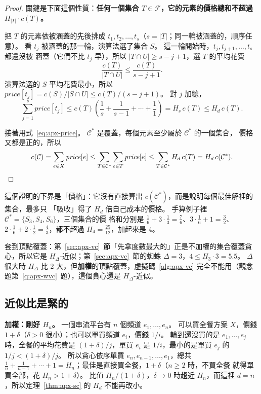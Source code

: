 \begin{proof}
關鍵是下面這個性質：\textbf{任何一個集合 $T \in \mathcal{F}$，它的元素的價格總和不超過
$H_{|T|} \cdot c(T)$。}

把 $T$ 的元素依被涵蓋的先後排成 $t_1, t_2, \ldots, t_s$（$s = |T|$；同一輪被涵蓋的，順序任意）。
看 $t_j$ 被涵蓋的那一輪，演算法選了集合 $S$。 這一輪開始時，$t_j, t_{j+1}, \ldots, t_s$ 都還沒被
涵蓋（它們不比 $t_j$ 早），所以 $|T \cap U| \ge s - j + 1$，選 $T$ 的平均花費
\[
\frac{c(T)}{|T \cap U|} \le \frac{c(T)}{s - j + 1}.
\]
演算法選的 $S$ 平均花費最小，所以 $\mathit{price}[t_j] = c(S) / |S \cap U| \le c(T) / (s - j + 1)$。
對 $j$ 加總，
\[
\sum_{j=1}^{s} \mathit{price}[t_j] \le c(T) \left(\frac1s + \frac1{s-1} + \cdots + \frac11\right)
= H_s\, c(T) \le H_d\, c(T).
\]

接著用式~\eqref{eq:apx-price}。 $\mathcal{C}^*$ 是覆蓋，每個元素至少屬於 $\mathcal{C}^*$ 的一個集合，
價格又都是正的，所以
\[
c(\mathcal{C}) = \sum_{e \in X} \mathit{price}[e]
\le \sum_{T \in \mathcal{C}^*} \sum_{e \in T} \mathit{price}[e]
\le \sum_{T \in \mathcal{C}^*} H_d\, c(T) = H_d\, c(\mathcal{C}^*). \qedhere
\]
\end{proof}

這個證明的下界是「價格」：它沒有直接算出 $c(\mathcal{C}^*)$，而是說明每個最佳解裡的集合，最多只
「吸收」得了 $H_d$ 倍自己成本的價格。 手算例子裡 $\mathcal{C}^* = \{S_3, S_4, S_6\}$，三個集合的價
格和分別是 $\frac16 + 3 \cdot \frac13 = \frac76$、$3 \cdot \frac16 + 1 = \frac32$、
$2 \cdot \frac16 + 2 \cdot \frac12 = \frac43$，都不超過 $H_4 = \frac{25}{12}$，加起來是 $4$。

套到頂點覆蓋：第~\ref{sec:apx-vc}~節「先拿度數最大的」正是不加權的集合覆蓋貪心，所以它是
$H_\Delta$-近似；第~\ref{sec:apx-vc}~節的蜘蛛 $\Delta = 3$，$4 \le H_3 \cdot 3 = 5.5$。 $\Delta$
很大時 $H_\Delta$ 比 $2$ 大，但\textbf{加權}的頂點覆蓋，虛擬碼~\ref{alg:apx-vc} 完全不能用（觀念
題第~\ref{q:apx-wvc}~題），這個貪心還是 $H_\Delta$-近似。

\subsection{近似比是緊的}

\textbf{加權：剛好 $H_n$。} 一個串流平台有 $n$ 個頻道 $e_1, \ldots, e_n$。 可以買全餐方案
$X$，價錢 $1 + \delta$（$\delta > 0$ 很小）；也可以單買頻道 $e_i$，價錢 $1/i$。 輪到還沒買的是
$e_1, \ldots, e_j$ 時，全餐的平均花費是 $(1 + \delta)/j$，單買 $e_i$ 是 $1/i$，最小的是單買 $e_j$
的 $1/j < (1 + \delta)/j$。 所以貪心依序單買 $e_n, e_{n-1}, \ldots, e_1$，總共
$\frac1n + \frac1{n-1} + \cdots + 1 = H_n$；最佳是直接買全餐，$1 + \delta$（$n \ge 2$ 時，不買全餐
就得單買全部，花 $H_n > 1 + \delta$）。 比值 $H_n/(1 + \delta)$，$\delta \to 0$ 時趨近
$H_n$，而這裡 $d = n$，所以定理~\ref{thm:apx-sc} 的 $H_d$ 不能再改小。


